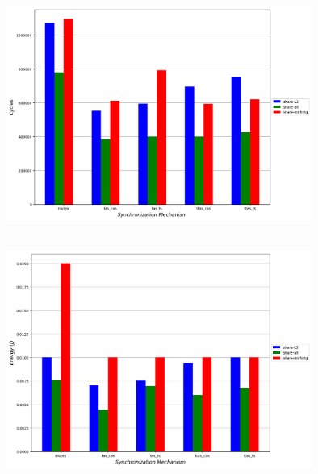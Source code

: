 \begin{minipage}{\textwidth}
   \begin{center}
      \\
      \vspace{3mm}
      \includegraphics[width=0.75\textwidth, frame]{./graphs/sniper/threads/topology-time-analysis.png}
      \vspace{6mm}
   \end{center}
\end{minipage}

\begin{minipage}{\textwidth}
   \begin{center}
      \\
      \vspace{3mm}
      \includegraphics[width=0.75\textwidth, frame]{./graphs/sniper/threads/topology-energy-analysis.png}
      \vspace{6mm}
   \end{center}
\end{minipage}


